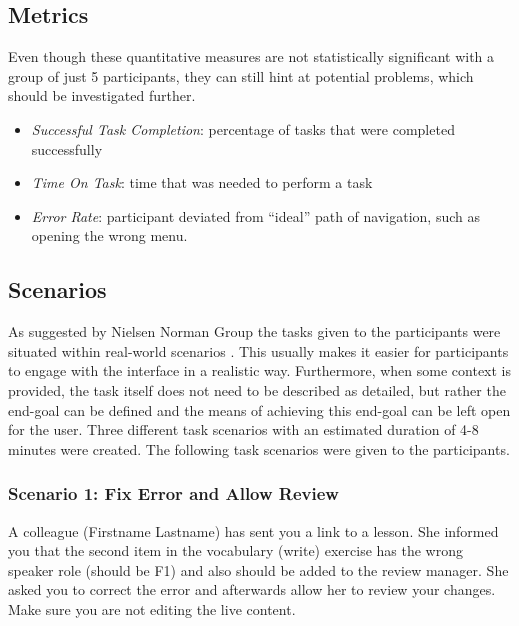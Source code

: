 \subsection{Metrics}
Even though these quantitative measures are not statistically significant with a group of just 5 participants, they can still hint at potential problems, which should be investigated further.


\begin{itemize}
  \item \emph{Successful Task Completion}: percentage of tasks that were completed successfully
  \item \emph{Time On Task}: time that was needed to perform a task
  \item \emph{Error Rate}: participant deviated from “ideal” path of navigation, such as opening the wrong menu.
\end{itemize}


\subsection{Scenarios} \label{sec:scenario-descriptions}
As suggested by Nielsen Norman Group the tasks given to the participants were situated within real-world scenarios \cite{_task_2014}. This usually makes it easier for participants to engage with the interface in a realistic way. Furthermore, when some context is provided, the task itself does not need to be described as detailed, but rather the end-goal can be defined and the means of achieving this end-goal can be left open for the user. Three different task scenarios with an estimated duration of 4-8 minutes were created. The following task scenarios were given to the participants.

\subsubsection{Scenario 1: Fix Error and Allow Review}
A colleague (Firstname Lastname) has sent you a link to a lesson. She informed you that the second item in the vocabulary (write) exercise has the wrong speaker role (should be F1) and also should be added to the review manager. She asked you to correct the error and afterwards allow her to review your changes. Make sure you are not editing the live content.


